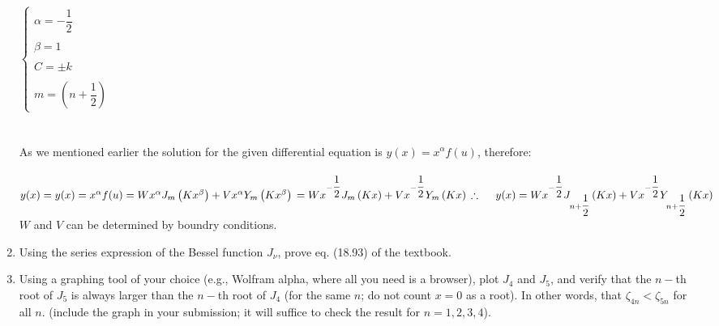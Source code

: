 \documentclass[fleqn]{article}
\begin{document}
\begin{enumerate}
{        \\
        $
          \begin{cases}
            \alpha=-\dfrac{1}{2} \\
            \\
            \beta=1 \\
            \\
            C=\pm k \\
            \\
            m=\left(n+\dfrac{1}{2}\right)
          \end{cases}
        $
        \\
        \\
        \\
        As we mentioned earlier the solution for the given differential equation is $ y(x)=x^{\alpha} f(u)$, therefore: \\
        \\
        $
          y(x)=y(x)=x^{\alpha} f(u)=W x^{\alpha} J_m \left(K x^{\beta}\right)+V x^{\alpha} Y_m \left(Kx^{\beta}\right) \\
          \\
          =W x^{-\dfrac{1}{2}} J_{m} \left(K x\right)+V x^{-\dfrac{1}{2}} Y_{m} \left(Kx\right) \\
          \\
          \\
          \\
          \therefore ~~~~ y(x)=W x^{-\dfrac{1}{2}} J_{n+\dfrac{1}{2}} \left(K x\right)+V x^{-\dfrac{1}{2}} Y_{n+\dfrac{1}{2}} \left(Kx\right) \\
          \\
        $
        $W$ and $V$ can be determined by boundry conditions.
      }

    \item Using the series expression of the Bessel function $J_{\nu}$, prove eq. (18.93) of the textbook. 


    \item Using a graphing tool of your choice (e.g., Wolfram alpha, where all you need is a browser), plot $J_4$ and $J_5$, and verify that the $n-$th root of $J_5$ is always larger than the $n-$th root of $J_4$ (for the same $n$; do not count $x=0$ as a root).  In other words, that $\zeta_{4n}<\zeta_{5n}$ for all $n$. (include the graph in your submission; it will suffice to check the result for $n=1,2,3,4$). 


  \end{enumerate}
\end{document}
